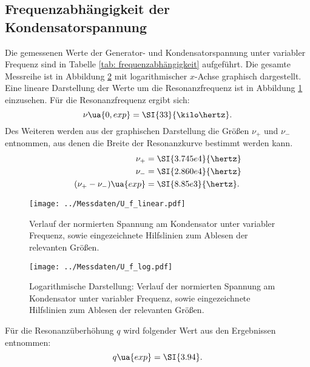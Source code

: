 \subsection{Frequenzabhängigkeit der Kondensatorspannung}
Die gemessenen Werte der Generator- und Kondensatorspannung unter variabler Frequenz sind in Tabelle \ref{tab: frequenzabhängigkeit} aufgeführt.
Die gesamte Messreihe ist in Abbildung \ref{fig: spannungsverlauf_U_C_log} mit logarithmischer $x$-Achse graphisch dargestellt. Eine lineare Darstellung
der Werte um die Resonanzfrequenz ist in Abbildung \ref{fig: spannungsverlauf_U_C}
einzusehen. Für die Resonanzfrequenz ergibt sich:
\begin{equation}
  \nu\ua{0, exp} = \SI{33}{\kilo\hertz}.
  \label{eq: exp_resonanzfrequenz}
\end{equation}
Des Weiteren werden aus der graphischen Darstellung die Größen $\nu_+$ und $\nu_-$ entnommen, aus denen die Breite der Resonanzkurve bestimmt werden kann.
\begin{align}
  \begin{aligned}
  \nu_{+} &= \SI{3.745e4}{\hertz} \\
  \nu_{-} &= \SI{2.860e4}{\hertz} \\
  (\nu_{+}-\nu_{-})\ua{exp} &= \SI{8.85e3}{\hertz}.
\end{aligned}
\label{eq: breite_exp}
\end{align}
\begin{figure}
  \centering
  \texttt{[image: ../Messdaten/U\_f\_linear.pdf]}
  \caption{Verlauf der normierten Spannung am Kondensator unter variabler Frequenz, sowie eingezeichnete Hilfslinien zum Ablesen der relevanten Größen.}
  \label{fig: spannungsverlauf_U_C}
\end{figure}

\begin{figure}
  \centering
  \texttt{[image: ../Messdaten/U\_f\_log.pdf]}
  \caption{Logarithmische Darstellung: Verlauf der normierten Spannung am Kondensator unter variabler Frequenz, sowie eingezeichnete Hilfslinien zum Ablesen der relevanten Größen.}
  \label{fig: spannungsverlauf_U_C_log}
\end{figure}

Für die Resonanzüberhöhung $q$ wird folgender Wert aus den Ergebnissen entnommen:
\begin{equation}
    q\ua{exp} = \SI{3.94}.
\end{equation}


